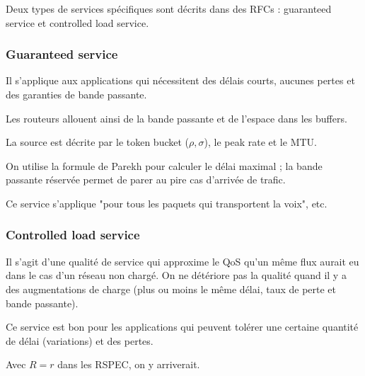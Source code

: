 \documentclass[10pt,a4paper]{report}
\begin{document}
		
		Deux types de services spécifiques sont décrits dans des RFCs : guaranteed service et controlled load service.
		
		
			\subsubsection{Guaranteed service}
			
			Il s'applique aux applications qui nécessitent des délais courts, aucunes pertes et des garanties de bande passante.
			
			Les routeurs allouent ainsi de la bande passante et de l'espace dans les buffers.
			
			La source est décrite par le token bucket ($\rho, \sigma$), le peak rate et le MTU.
			
			On utilise la formule de Parekh pour calculer le délai maximal ; la bande passante réservée permet de parer au pire cas d'arrivée de trafic.
			
			Ce service s'applique "pour tous les paquets qui transportent la voix", etc.
			
			\subsubsection{Controlled load service}
		
			Il s'agit d'une qualité de service qui approxime le QoS qu'un même flux aurait eu dans le cas d'un réseau non chargé. On ne détériore pas la qualité quand il y a des augmentations de charge (plus ou moins le même délai, taux de perte et bande passante).
			
			Ce service est bon pour les applications qui peuvent tolérer une certaine quantité de délai (variations) et des pertes.
			
			Avec $R = r$ dans les RSPEC, on y arriverait.
			
\end{document}
